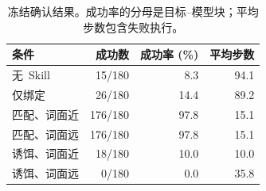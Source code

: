 \begin{table}[t]
\centering
\caption{冻结确认结果。成功率的分母是目标--模型块；平均步数包含失败执行。}
\label{tab:main}
\begin{tabular}{lrrr}
\toprule
条件 & 成功数 & 成功率 (\%) & 平均步数 \\
\midrule
\mbox{无 Skill} & 15/180 & 8.3 & 94.1 \\
\mbox{仅绑定} & 26/180 & 14.4 & 89.2 \\
\mbox{匹配、词面近} & 176/180 & 97.8 & 15.1 \\
\mbox{匹配、词面远} & 176/180 & 97.8 & 15.1 \\
\mbox{诱饵、词面近} & 18/180 & 10.0 & 10.0 \\
\mbox{诱饵、词面远} & 0/180 & 0.0 & 35.8 \\
\bottomrule
\end{tabular}
\end{table}
